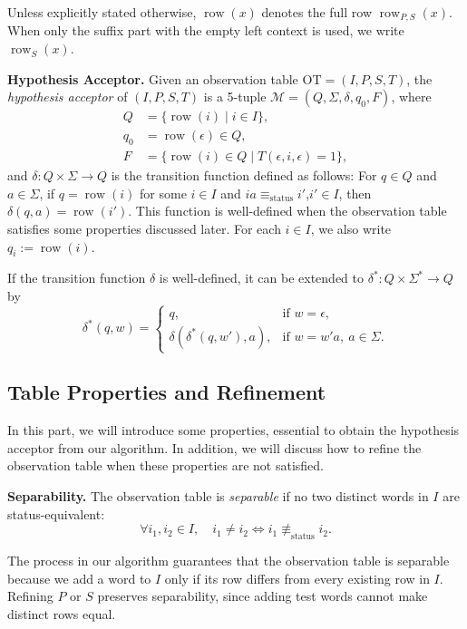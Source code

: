\documentclass{ieice-tecrep}
\begin{document}
Unless explicitly stated otherwise, \(\operatorname{row}(x)\)
denotes the full row \(\operatorname{row}_{P,S}(x)\). When only the suffix part
with the empty left context is used, we write \(\operatorname{row}_S(x)\).

\textbf{Hypothesis Acceptor.}
Given an observation table \(\mathrm{OT} = (I,P,S,T)\), the \emph{hypothesis acceptor} of \((I,P,S,T)\) is a 5-tuple \(\mathcal{M} = (Q,\Sigma,\delta,q_0,F)\), where
\[
\begin{aligned}
Q &= \{\operatorname{row}(i)\mid i \in I\},\\
q_0 &= \operatorname{row}(\epsilon) \in Q,\\
F &= \{\operatorname{row}(i) \in Q \mid T(\epsilon,i,\epsilon)=1\},
\end{aligned}
\]
and \(\delta:Q \times \Sigma\to Q\) is the transition function defined as follows:
For \(q \in Q\) and \(a\in \Sigma\), if \(q = \operatorname{row}(i)\) for some
\(i \in I\) and \( ia \equiv_{\mathrm{status}} i'\),\(i'\in I\), then \(\delta(q,a)=\operatorname{row}(i')\).
This function is well-defined when the observation table satisfies some properties discussed later.
For each \(i\in I\), we also write \(q_i:=\operatorname{row}(i)\).

If the transition function \(\delta\) is well-defined, it can be extended to \(\delta^{*}:Q \times \Sigma^{*} \to Q\) by
\[
\delta^{*}(q,w) =
\left\{
\begin{array}{ll}
q, & \text{if } w = \epsilon, \\
\delta(\delta^*(q,w'),a), & \text{if } w = w'a,\ a \in \Sigma.
\end{array}
\right.
\]
\subsection{Table Properties and Refinement}\label{algorithm-properties-refinement}

In this part, we will introduce some properties, essential to obtain the hypothesis acceptor from our algorithm.
In addition, we will discuss how to refine the observation table when these properties are not satisfied.

\textbf{Separability.}
The observation table is \emph{separable} if no two distinct words in \(I\) are status-equivalent:
\[
\forall i_1,i_2 \in I,\quad
i_1 \neq i_2 \Longleftrightarrow i_1 \not\equiv_{\mathrm{status}} i_2.
\]

The process in our algorithm guarantees that the observation table is separable because
we add a word to \(I\) only if its row differs
from every existing row in \(I\). Refining \(P\) or \(S\)
preserves separability, since adding test words cannot make distinct
rows equal.
\end{document}
